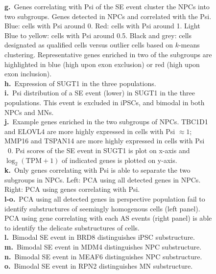 \begin{figure}[h]
{\textbf{g.}~Genes correlating with Psi of the SE event cluster the NPCs into two subgroups. Genes detected in NPCs and correlated with the Psi. Blue: cells with Psi around 0. Red: cells with Psi around 1. Light Blue to yellow: cells with Psi around 0.5. Black and grey: cells designated as qualified cells versus outlier cells based on $k$-means clustering. Representative genes enriched in two of the subgroups are highlighted in blue (high upon exon exclusion) or red (high upon exon inclusion). \\
\textbf{h.}~Expression of SUGT1 in the three populations.\\
\textbf{i.}~Psi distribution of a SE event (lower) in SUGT1 in the three populations. This event is excluded in iPSCs, and bimodal in both NPCs and MNs.\\
\textbf{j.}~Example genes enriched in the two subgroups of NPCs. TBC1D1 and ELOVL4 are more highly expressed in cells with Psi $\approx 1$; MMP16 and TSPAN14 are more highly expressed in cells with Psi ~0. Psi scores of the SE event in SUGT1 is plot on x-axis and $\log_2(\mathrm{TPM}+1)$ of indicated genes is plotted on y-axis.\\
\textbf{k.}~Only genes correlating with Psi is able to separate the two subgroups in NPCs. Left: PCA using all detected genes in NPCs. Right: PCA using genes correlating with Psi.\\
\textbf{l-o.}~PCA using all detected genes in perspective population fail to identify substructures of seemingly homogenous cells (left panel). PCA using gene correlating with each AS events (right panel) is able to identify the delicate substructures of cells.\\
\textbf{l.}~Bimodal SE event in BRD8 distinguishes iPSC substructure.\\
\textbf{m.}~Bimodal SE event in MDM4 distinguishes NPC substructure.\\
\textbf{n.}~Bimodal SE event in MEAF6 distinguishes NPC substructure.\\
\textbf{o.}~Bimodal SE event in RPN2 distinguishes MN substructure.\\
}
\label{fig:bimodal_correlations}
\end{figure}



